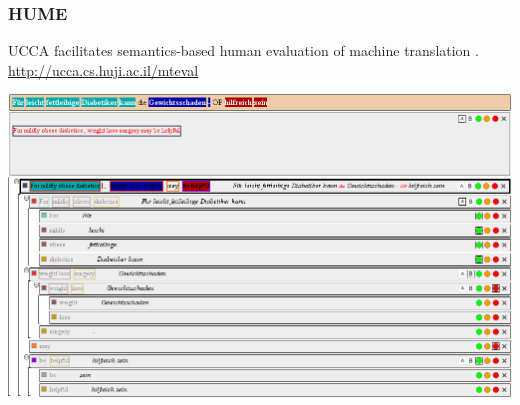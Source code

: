 \documentclass[t]{beamer}
\begin{document}
\begin{frame}
\frametitle{HUME}
UCCA facilitates semantics-based human evaluation of machine translation \cite{birch2016hume}.
\footnotesize\url{http://ucca.cs.huji.ac.il/mteval}
\vfill
\begin{adjustbox}{center}
  \includegraphics[width=\pagewidth,height=\textheight,keepaspectratio]{hume.png}
\end{adjustbox}
\end{frame}
\end{document}
